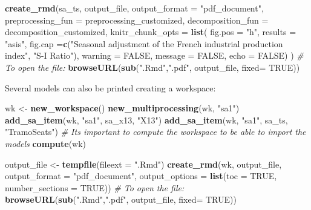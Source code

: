 \documentclass[
]{article}
\newenvironment{Shaded}{\begin{snugshade}}{\end{snugshade}}
\newcommand{\AttributeTok}[1]{\textcolor[rgb]{0.13,0.29,0.53}{#1}}
\newcommand{\CommentTok}[1]{\textcolor[rgb]{0.56,0.35,0.01}{\textit{#1}}}
\newcommand{\ConstantTok}[1]{\textcolor[rgb]{0.56,0.35,0.01}{#1}}
\newcommand{\FunctionTok}[1]{\textcolor[rgb]{0.13,0.29,0.53}{\textbf{#1}}}
\newcommand{\NormalTok}[1]{#1}
\newcommand{\OtherTok}[1]{\textcolor[rgb]{0.56,0.35,0.01}{#1}}
\newcommand{\StringTok}[1]{\textcolor[rgb]{0.31,0.60,0.02}{#1}}
\begin{document}
\begin{Shaded}
\begin{Highlighting}[]
\FunctionTok{create\_rmd}\NormalTok{(sa\_ts, output\_file, }\AttributeTok{output\_format =} \StringTok{"pdf\_document"}\NormalTok{,}
           \AttributeTok{preprocessing\_fun =}\NormalTok{ preprocessing\_customized,}
           \AttributeTok{decomposition\_fun =}\NormalTok{ decomposition\_customized,}
           \AttributeTok{knitr\_chunk\_opts =} \FunctionTok{list}\NormalTok{(}
             \AttributeTok{fig.pos =} \StringTok{"h"}\NormalTok{, }\AttributeTok{results =} \StringTok{"asis"}\NormalTok{, }
             \AttributeTok{fig.cap =}\FunctionTok{c}\NormalTok{(}\StringTok{"Seasonal adjustment of the French industrial production index"}\NormalTok{,}
                        \StringTok{"S{-}I Ratio"}\NormalTok{),}
             \AttributeTok{warning =} \ConstantTok{FALSE}\NormalTok{, }\AttributeTok{message =} \ConstantTok{FALSE}\NormalTok{, }\AttributeTok{echo =} \ConstantTok{FALSE}\NormalTok{)}
\NormalTok{           )}
\CommentTok{\# To open the file:}
\FunctionTok{browseURL}\NormalTok{(}\FunctionTok{sub}\NormalTok{(}\StringTok{".Rmd"}\NormalTok{,}\StringTok{".pdf"}\NormalTok{, output\_file, }\AttributeTok{fixed=} \ConstantTok{TRUE}\NormalTok{))}
\end{Highlighting}
\end{Shaded}

Several models can also be printed creating a workspace:

\begin{Shaded}
\begin{Highlighting}[]
\NormalTok{wk }\OtherTok{\textless{}{-}} \FunctionTok{new\_workspace}\NormalTok{()}
\FunctionTok{new\_multiprocessing}\NormalTok{(wk, }\StringTok{"sa1"}\NormalTok{)}
\FunctionTok{add\_sa\_item}\NormalTok{(wk, }\StringTok{"sa1"}\NormalTok{, sa\_x13, }\StringTok{"X13"}\NormalTok{)}
\FunctionTok{add\_sa\_item}\NormalTok{(wk, }\StringTok{"sa1"}\NormalTok{, sa\_ts, }\StringTok{"TramoSeats"}\NormalTok{)}
\CommentTok{\# It\textquotesingle{}s important to compute the workspace to be able to import the models}
\FunctionTok{compute}\NormalTok{(wk)}

\NormalTok{output\_file }\OtherTok{\textless{}{-}} \FunctionTok{tempfile}\NormalTok{(}\AttributeTok{fileext =} \StringTok{".Rmd"}\NormalTok{)}
\FunctionTok{create\_rmd}\NormalTok{(wk, output\_file, }\AttributeTok{output\_format =} \StringTok{"pdf\_document"}\NormalTok{,}
           \AttributeTok{output\_options =} \FunctionTok{list}\NormalTok{(}\AttributeTok{toc =} \ConstantTok{TRUE}\NormalTok{,}
                                 \AttributeTok{number\_sections =} \ConstantTok{TRUE}\NormalTok{))}
\CommentTok{\# To open the file:}
\FunctionTok{browseURL}\NormalTok{(}\FunctionTok{sub}\NormalTok{(}\StringTok{".Rmd"}\NormalTok{,}\StringTok{".pdf"}\NormalTok{, output\_file, }\AttributeTok{fixed=} \ConstantTok{TRUE}\NormalTok{))}
\end{Highlighting}
\end{Shaded}
\end{document}
